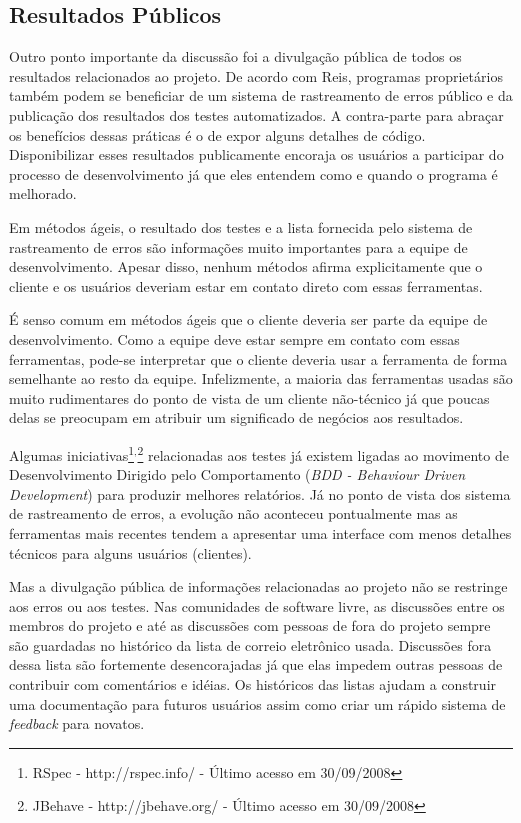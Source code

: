 \subsection{Resultados Públicos}
\label{subsec:publicity}

Outro ponto importante da discussão foi a divulgação pública de todos
os resultados relacionados ao projeto. De acordo com Reis, programas
proprietários também podem se beneficiar de um sistema de rastreamento
de erros público e da publicação dos resultados dos testes
automatizados. A contra-parte para abraçar os benefícios dessas
práticas é o de expor alguns detalhes de código. Disponibilizar esses
resultados publicamente encoraja os usuários a participar do processo
de desenvolvimento já que eles entendem como e quando o programa é
melhorado.

Em métodos ágeis, o resultado dos testes e a lista fornecida pelo
sistema de rastreamento de erros são informações muito importantes
para a equipe de desenvolvimento. Apesar disso, nenhum métodos afirma
explicitamente que o cliente e os usuários deveriam estar em contato
direto com essas ferramentas.

É senso comum em métodos ágeis que o cliente deveria ser parte da
equipe de desenvolvimento. Como a equipe deve estar sempre em contato
com essas ferramentas, pode-se interpretar que o cliente deveria usar
a ferramenta de forma semelhante ao resto da equipe. Infelizmente, a
maioria das ferramentas usadas são muito rudimentares do ponto de
vista de um cliente não-técnico já que poucas delas se preocupam em
atribuir um significado de negócios aos resultados.

Algumas iniciativas\footnote{RSpec - http://rspec.info/ - Último
  acesso em 30/09/2008}$^{, }$\footnote{JBehave - http://jbehave.org/
  - Último acesso em 30/09/2008} relacionadas aos testes já existem
ligadas ao movimento de Desenvolvimento Dirigido pelo Comportamento
(\emph{BDD - Behaviour Driven Development}) \cite{North2006} para
produzir melhores relatórios. Já no ponto de vista dos sistema de
rastreamento de erros, a evolução não aconteceu pontualmente mas as
ferramentas mais recentes tendem a apresentar uma interface com menos
detalhes técnicos para alguns usuários (clientes).

Mas a divulgação pública de informações relacionadas ao projeto não se
restringe aos erros ou aos testes. Nas comunidades de software livre,
as discussões entre os membros do projeto e até as discussões com
pessoas de fora do projeto sempre são guardadas no histórico da lista
de correio eletrônico usada. Discussões fora dessa lista são
fortemente desencorajadas já que elas impedem outras pessoas de
contribuir com comentários e idéias. Os históricos das listas ajudam a
construir uma documentação para futuros usuários assim como criar um
rápido sistema de \emph{feedback} para novatos.

